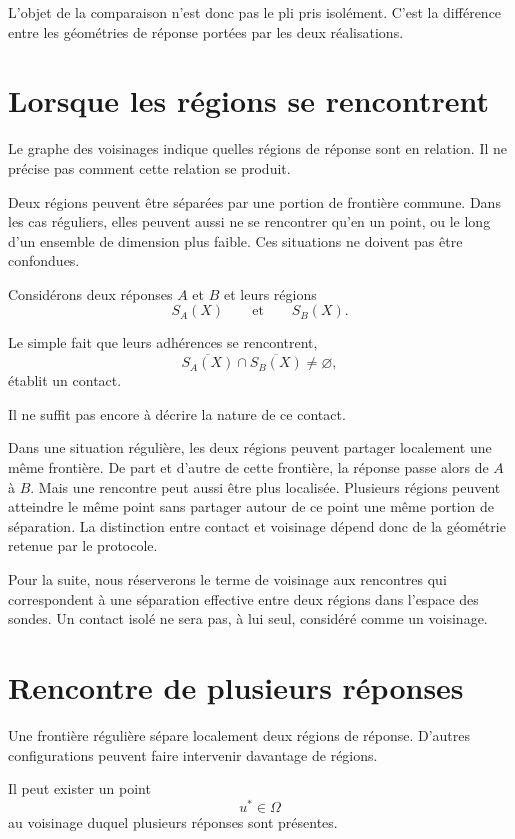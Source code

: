L'objet de la comparaison n'est donc pas le pli pris isolément. C'est la différence entre les géométries de réponse portées par les deux réalisations.

\section{Lorsque les régions se rencontrent}
\label{t3-lorsque-regions-se-rencontrent}

Le graphe des voisinages indique quelles régions de réponse sont en relation. Il ne précise pas comment cette relation se produit.

Deux régions peuvent être séparées par une portion de frontière commune. Dans les cas réguliers, elles peuvent aussi ne se rencontrer qu'en un point, ou le long d'un ensemble de dimension plus faible. Ces situations ne doivent pas être confondues.

Considérons deux réponses $A$ et $B$ et leurs régions
\[
S_A(X)
\qquad\text{et}\qquad
S_B(X).
\]

Le simple fait que leurs adhérences se rencontrent,
\[
\overline{S_A(X)}
\cap
\overline{S_B(X)}
\neq
\varnothing,
\]
établit un contact.

Il ne suffit pas encore à décrire la nature de ce contact.

Dans une situation régulière, les deux régions peuvent partager localement une même frontière. De part et d'autre de cette frontière, la réponse passe alors de $A$ à $B$. Mais une rencontre peut aussi être plus localisée. Plusieurs régions peuvent atteindre le même point sans partager autour de ce point une même portion de séparation. La distinction entre contact et voisinage dépend donc de la géométrie retenue par le protocole.

Pour la suite, nous réserverons le terme de voisinage aux rencontres qui correspondent à une séparation effective entre deux régions dans l'espace des sondes. Un contact isolé ne sera pas, à lui seul, considéré comme un voisinage.

\section{Rencontre de plusieurs réponses}
\label{t3-rencontre-plusieurs-reponses}

Une frontière régulière sépare localement deux régions de réponse. D'autres configurations peuvent faire intervenir davantage de régions.

Il peut exister un point
\[
u^\ast\in\Omega
\]
au voisinage duquel plusieurs réponses sont présentes.

